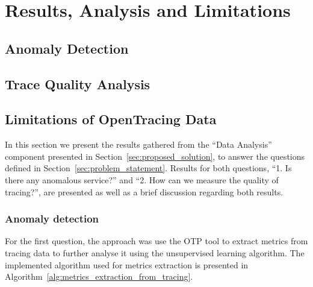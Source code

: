 \glsresetall
\chapter{Results, Analysis and Limitations}
\label{chap:results_analysis_and_limitations}


\section{Anomaly Detection}
\label{sec:anomaly_detection}


\section{Trace Quality Analysis}
\label{sec:trace_quality_analysis}


%

\section{Limitations of OpenTracing Data}
\label{sec:limitations_of_opentracing_data}


In this section we present the results gathered from the ``Data Analysis'' component presented in Section~\ref{sec:proposed_solution}, to answer the questions defined in Section~\ref{sec:problem_statement}. Results for both questions, ``1. Is there any anomalous service?'' and ``2.  How can we measure the quality of tracing?'', are presented as well as a brief discussion regarding both results.

\subsection{Anomaly detection}
\label{subsec:first_question}

For the first question, the approach was use the OTP tool to extract metrics from tracing data to further analyse it using the unsupervised learning algorithm. The implemented algorithm used for metrics extraction is presented in Algorithm~\ref{alg:metrics_extraction_from_tracing}.

